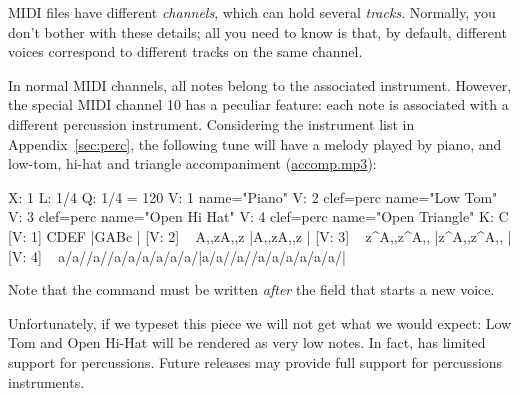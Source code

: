 \documentclass[a4paper,12pt]{book}
\begin{document}
MIDI files have different \emph{channels}, which can hold several
\emph{tracks}. Normally, you don't bother with these details; all you
need to know is that, by default, different voices correspond to
different tracks on the same channel.

In normal MIDI channels, all notes belong to the associated
instrument. However, the special MIDI channel 10 has a peculiar
feature: each note is associated with a different percussion
instrument. Considering the instrument list in
Appendix~\ref{sec:perc}, the following tune will have a melody played
by piano, and low-tom, hi-hat and triangle accompaniment
(\href{run:accomp.mp3}{accomp.mp3}):

\begin{abcsource}
X: 1
L: 1/4
Q: 1/4 = 120
V: 1 name="Piano"
V: 2 clef=perc name="Low Tom"
V: 3 clef=perc name="Open Hi Hat"
V: 4 clef=perc name="Open Triangle"
K: C
%
[V: 1] CDEF         |GABc                | %
[V: 2] \
A,,zA,,z            |A,,zA,,z            | %
[V: 3] \
z^A,,z^A,,          |z^A,,z^A,,          | %
[V: 4] \
a/a//a//a/a/a/a/a/a/|a/a//a//a/a/a/a/a/a/| %
\end{abcsource}

Note that the \metacmd{MIDI channel 10} command must be written
\emph{after} the  field that starts a new voice.

Unfortunately, if we typeset this piece we will not get what we would
expect: Low Tom and Open Hi-Hat will be rendered as very low notes. In
fact, \abcm{} has limited support for percussions. Future releases may
provide full support for percussions instruments.









\end{document}
